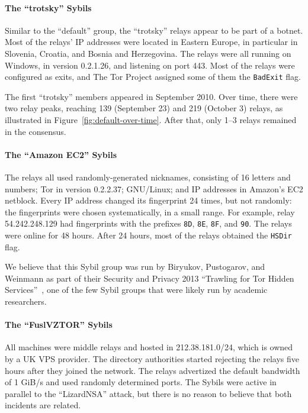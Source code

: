 \paragraph{The ``trotsky'' Sybils}
Similar to the ``default'' group, the ``trotsky'' relays appear to be part of
a botnet.  Most of the relays' IP addresses were located in Eastern Europe, in
particular in Slovenia, Croatia, and Bosnia and Herzegovina.  The relays were
all running on Windows, in version 0.2.1.26, and listening on port 443.  Most of
the relays were configured as exits, and The Tor Project assigned some of them
the \texttt{BadExit} flag.

The first ``trotsky'' members appeared in September 2010.  Over time, there were
two relay peaks, reaching 139 (September 23) and 219 (October 3) relays, as
illustrated in Figure~\ref{fig:default-over-time}.  After that, only 1--3 relays
remained in the consensus.

\paragraph{The ``Amazon EC2'' Sybils}
The relays all used randomly-generated nicknames, consisting of 16 letters and
numbers; Tor in version 0.2.2.37; GNU/Linux; and IP addresses in Amazon's EC2
netblock.  Every IP address changed its fingerprint 24 times, but not randomly:
the fingerprints were chosen systematically, in a small range.  For example,
relay 54.242.248.129 had fingerprints with the prefixes \texttt{8D},
\texttt{8E}, \texttt{8F}, and \texttt{90}.  The relays were online for 48 hours.
After 24 hours, most of the relays obtained the \texttt{HSDir} flag.

We believe that this Sybil group was run by Biryukov, Pustogarov, and Weinmann
as part of their Security and Privacy 2013 ``Trawling for Tor Hidden
Services''~\cite{Biryukov2013a}, one of the few Sybil groups that were likely
run by academic researchers.

\paragraph{The ``FuslVZTOR'' Sybils}
All machines were middle relays and hosted in 212.38.181.0/24, which is owned by
a UK VPS provider.  The directory authorities started rejecting the relays five
hours after they joined the network.  The relays advertized the default bandwidth
of 1 GiB/s and used randomly determined ports.  The Sybils were active in
parallel to the ``LizardNSA'' attack, but there is no reason to believe that
both incidents are related.


